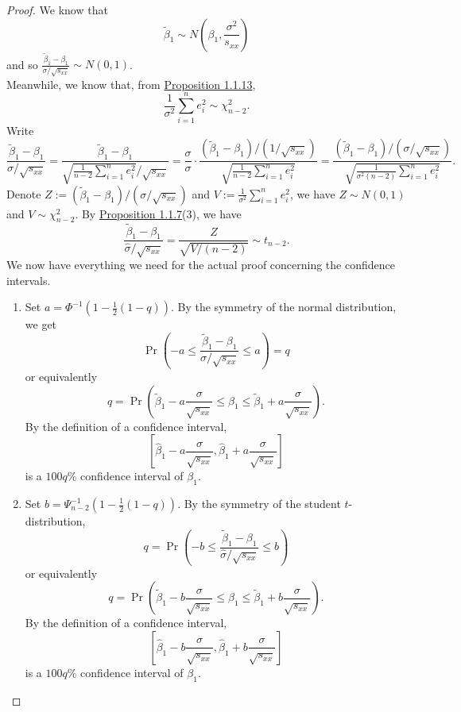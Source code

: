 \documentclass[11pt,fleqn]{book} %
\begin{document}
\begin{proof} We know that
\[
\tilde{\beta}_1 \sim N\left(\beta_1, \frac{\sigma^2}{s_{xx}}\right)
\]
and so \(\frac{\tilde{\beta}_1 - \beta_1}{\sigma/\sqrt{s_{xx}}} \sim N(0, 1)\). \\
\indent Meanwhile, we know that, from \hyperref[prop:1113]{Proposition 1.1.13}, 
\[
\frac{1}{\sigma^2}\sum_{i=1}^ne_i^2 \sim \chi^2_{n - 2}.
\]
\indent Write
\[
\frac{\tilde{\beta}_1 - \beta_1}{\hat{\sigma}/\sqrt{s_{xx}}} = \frac{\tilde{\beta}_1 - \beta_1}{\sqrt{\frac{1}{n - 2}\sum_{i=1}^ne_i^2}/\sqrt{s_{xx}}} = \frac{\sigma}{\sigma}\cdot\frac{(\tilde{\beta}_1 - \beta_1)/(1 / \sqrt{s_{xx}})}{\sqrt{\frac{1}{n - 2}\sum_{i=1}^ne_i^2}} = \frac{(\tilde{\beta}_1 - \beta_1) / (\sigma / \sqrt{s_{xx}})}{\sqrt{\frac{1}{\sigma^2(n - 2)}\sum_{i=1}^ne_i^2}}.
\]
\indent Denote \(Z := (\tilde{\beta}_1 - \beta_1) / (\sigma / \sqrt{s_{xx}})\) and \(V := \frac{1}{\sigma^2}\sum_{i=1}^ne_i^2\), we have \(Z \sim N(0, 1)\) and \(V \sim \chi^2_{n - 2}\). By \hyperref[prop:117]{Proposition 1.1.7}(3), we have
\[
\frac{\tilde{\beta}_1 - \beta_1}{\hat{\sigma} / \sqrt{s_{xx}}} = \frac{Z}{\sqrt{V / (n - 2)}} \sim t_{n - 2}.
\]
We now have everything we need for the actual proof concerning the confidence intervals.
\begin{enumerate}
\item Set \(a = \Phi^{-1}(1 - \frac12(1 - q))\). By the symmetry of the normal distribution, we get
\[
\Pr\left(-a \leq \frac{\tilde{\beta}_1 - \beta_1}{\sigma / \sqrt{s_{xx}}} \leq a\right) = q
\]
or equivalently
\[
q = \Pr\left(\tilde{\beta}_1 - a\frac{\sigma}{\sqrt{s_{xx}}} \leq \beta_1 \leq \tilde{\beta}_1 + a\frac{\sigma}{\sqrt{s_{xx}}}\right).
\]
\indent By the definition of a confidence interval, 
\[
\left[\hat{\beta}_1 - a\frac{\sigma}{\sqrt{s_{xx}}}, \hat{\beta}_1 + a\frac{\sigma}{\sqrt{s_{xx}}}\right]
\]
is a \(100q\%\) confidence interval of \(\beta_1\).
\item Set \(b = \Psi^{-1}_{n - 2}\left(1 - \frac12(1 - q)\right)\). By the symmetry of the student \(t\)-distribution,
\[
q = \Pr\left(-b \leq \frac{\tilde{\beta}_1 - \beta_1}{\hat{\sigma} / \sqrt{s_{xx}}} \leq b\right)
\]
or equivalently
\[
q = \Pr\left(\tilde{\beta}_1 - b\frac{\sigma}{\sqrt{s_{xx}}} \leq \beta_1 \leq \tilde{\beta}_1 + b\frac{\sigma}{\sqrt{s_{xx}}}\right).
\]
\indent By the definition of a confidence interval, 
\[
\left[\hat{\beta}_1 - b\frac{\sigma}{\sqrt{s_{xx}}}, \hat{\beta}_1 + b\frac{\sigma}{\sqrt{s_{xx}}}\right]
\]
is a \(100q\%\) confidence interval of \(\beta_1\).
\end{enumerate}
\end{proof}
\end{document}
